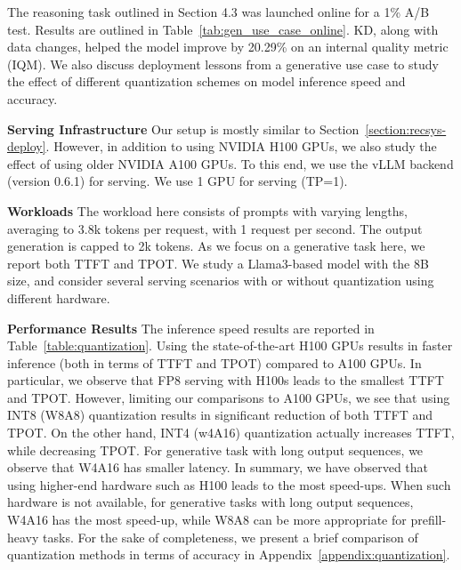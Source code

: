 The reasoning task outlined in Section 4.3 was launched online for a 1\% A/B test. Results are outlined in Table~\ref{tab:gen_use_case_online}. KD, along with data changes, helped the model improve by 20.29\% on an internal quality metric (IQM). We also discuss deployment lessons from a generative use case to study the effect of different quantization schemes on model inference speed and accuracy. 

\noindent \textbf{Serving Infrastructure} Our setup is mostly similar to Section~\ref{section:recsys-deploy}. However, in addition to using NVIDIA H100 GPUs, we also study the effect of using older NVIDIA A100 GPUs. To this end, 
we use the vLLM backend (version 0.6.1) for serving. We use 1 GPU for serving (TP=1).

\noindent \textbf{Workloads} The workload here consists of prompts with varying lengths, averaging to 3.8k tokens per request, with 1 request per second. The output generation is capped to 2k tokens. As we focus on a generative task here, we report both TTFT and TPOT. We study a Llama3-based model with the 8B size, and consider several serving scenarios with or without quantization using different hardware.

\noindent \textbf{Performance Results} The inference speed results are reported in Table~\ref{table:quantization}. Using the state-of-the-art H100 GPUs results in faster inference (both in terms of TTFT and TPOT) compared to A100 GPUs. In particular, we observe that FP8 serving with H100s leads to the smallest TTFT and TPOT. However, limiting our comparisons to A100 GPUs, we see that using INT8 (W8A8) quantization results in significant reduction of both TTFT and TPOT. On the other hand, INT4 (w4A16) quantization actually increases TTFT, while decreasing TPOT. For generative task with long output sequences, we observe that W4A16 has smaller latency. In summary, we have observed that using higher-end hardware such as H100 leads to the most speed-ups. When such hardware is not available, for generative tasks with long output sequences, W4A16 has the most speed-up, while W8A8 can be more appropriate for prefill-heavy tasks. For the sake of completeness, we present a brief comparison of quantization methods in terms of accuracy in Appendix~\ref{appendix:quantization}.






